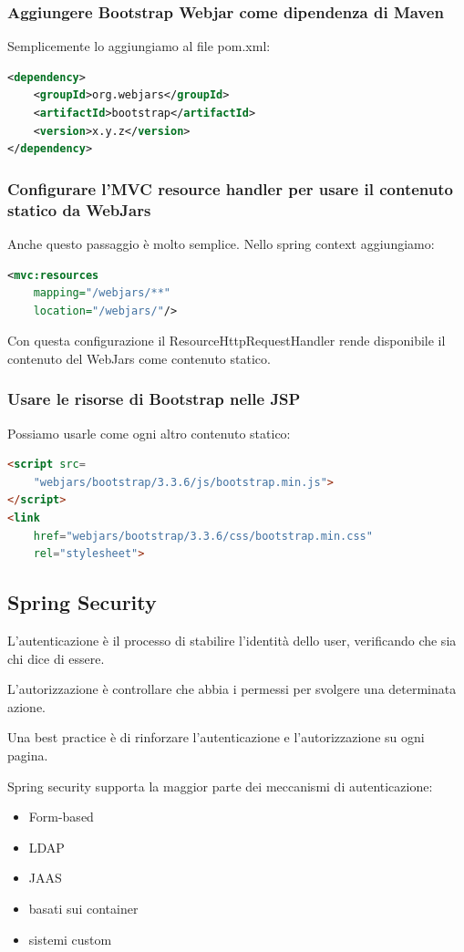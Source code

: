 \documentclass[11pt,a4paper]{book}
\begin{document}
\subsubsection{Aggiungere Bootstrap Webjar come dipendenza di Maven}
Semplicemente lo aggiungiamo al file pom.xml:
\begin{lstlisting}[language = XML]
<dependency>
	<groupId>org.webjars</groupId>
	<artifactId>bootstrap</artifactId>
	<version>x.y.z</version>
</dependency>
\end{lstlisting}

\subsubsection{Configurare l'MVC resource handler per usare il contenuto statico da WebJars}
Anche questo passaggio è molto semplice. Nello spring context aggiungiamo:
\begin{lstlisting}[language = XML]
<mvc:resources 
	mapping="/webjars/**" 
	location="/webjars/"/>
\end{lstlisting}

Con questa configurazione il ResourceHttpRequestHandler rende disponibile il contenuto del WebJars come contenuto statico.

\subsubsection{Usare le risorse di Bootstrap nelle JSP}
Possiamo usarle come ogni altro contenuto statico:
\begin{lstlisting}[language = HTML]
<script src=
	"webjars/bootstrap/3.3.6/js/bootstrap.min.js">
</script>
<link
	href="webjars/bootstrap/3.3.6/css/bootstrap.min.css"
	rel="stylesheet">
\end{lstlisting}

\subsection{Spring Security}
L'autenticazione è il processo di stabilire l'identità dello user, verificando che sia chi dice di essere.

L'autorizzazione è controllare che abbia i permessi per svolgere una determinata azione.

Una best practice è di rinforzare l'autenticazione e l'autorizzazione su ogni pagina.

Spring security supporta la maggior parte dei meccanismi di autenticazione:
\begin{itemize}
	\item Form-based
	\item LDAP
	\item JAAS
	\item basati sui container
	\item sistemi custom
\end{itemize} 
\end{document}
